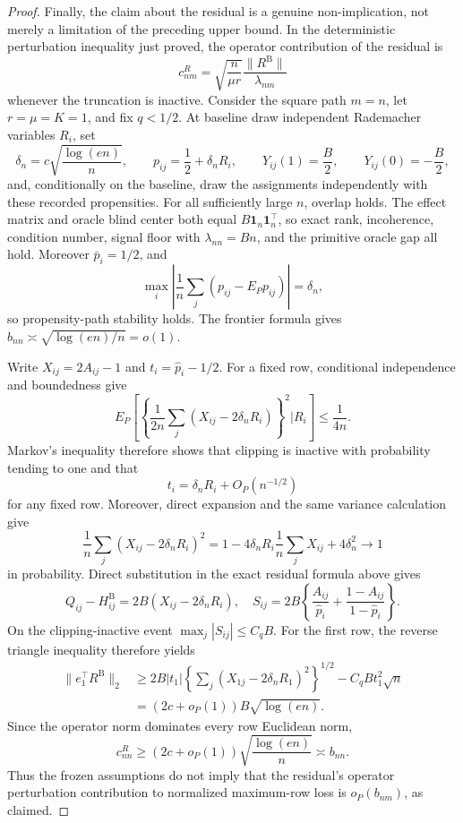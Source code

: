 \documentclass{article}
\begin{document}
\begin{proof}
Finally, the claim about the residual is a genuine non-implication, not merely a limitation of the preceding upper bound.  In the deterministic perturbation inequality just proved, the operator contribution of the residual is
\[
 c^{R}_{nm}=\sqrt{\frac n{\mu r}}\frac{\lVert R^{\mathrm B}\rVert}{\lambda_{nm}}
\]
whenever the truncation is inactive.  Consider the square path \(m=n\), let \(r=\mu=K=1\), and fix \(q<1/2\).  At baseline draw independent Rademacher variables \(R_i\), set
\[
 \delta_n=c\sqrt{\frac{\log(en)}n},\qquad
 p_{ij}=\frac12+\delta_nR_i,\qquad
 Y_{ij}(1)=\frac B2,\qquad Y_{ij}(0)=-\frac B2,
\]
and, conditionally on the baseline, draw the assignments independently with these recorded propensities.  For all sufficiently large \(n\), overlap holds.  The effect matrix and oracle blind center both equal \(B\mathbf1_n\mathbf1_n^\top\), so exact rank, incoherence, condition number, signal floor with \(\lambda_{nn}=Bn\), and the primitive oracle gap all hold.  Moreover \(\bar p_i=1/2\), and
\[
 \max_i\left|\frac1n\sum_j(p_{ij}-E_Pp_{ij})\right|=\delta_n,
\]
so propensity-path stability holds.  The frontier formula gives \(b_{nn}\asymp\sqrt{\log(en)/n}=o(1)\).

Write \(X_{ij}=2A_{ij}-1\) and \(t_i=\widehat p_i-1/2\).  For a fixed row, conditional independence and boundedness give
\[
 E_P\!\left[\left\{\frac1{2n}\sum_j(X_{ij}-2\delta_nR_i)\right\}^2
 \mathrel{\Big|}R_i\right]\le\frac1{4n}.
\]
Markov's inequality therefore shows that clipping is inactive with probability tending to one and that
\[
 t_i=\delta_nR_i+O_P(n^{-1/2})
\]
for any fixed row.  Moreover, direct expansion and the same variance calculation give
\[
 \frac1n\sum_j(X_{ij}-2\delta_nR_i)^2
 =1-4\delta_nR_i\frac1n\sum_jX_{ij}+4\delta_n^2
 \longrightarrow1
\]
in probability.  Direct substitution in the exact residual formula above gives
\[
 Q_{ij}-H^{\mathrm B}_{ij}=2B(X_{ij}-2\delta_nR_i),
 \quad
 S_{ij}=2B\left\{\frac{A_{ij}}{\widehat p_i}
 +\frac{1-A_{ij}}{1-\widehat p_i}\right\}.
\]
On the clipping-inactive event \(\max_j|S_{ij}|\le C_qB\).  For the first row, the reverse triangle inequality therefore yields
\[
 \begin{aligned}
 \lVert e_1^\top R^{\mathrm B}\rVert_2
 &\ge 2B|t_1|
 \left\{\sum_j(X_{1j}-2\delta_nR_1)^2\right\}^{1/2}
 -C_qBt_1^2\sqrt n\\
 &=(2c+o_P(1))B\sqrt{\log(en)}.
 \end{aligned}
\]
Since the operator norm dominates every row Euclidean norm,
\[
 c^R_{nn}\ge(2c+o_P(1))\sqrt{\frac{\log(en)}n}\asymp b_{nn}.
\]
Thus the frozen assumptions do not imply that the residual's operator perturbation contribution to normalized maximum-row loss is \(o_P(b_{nm})\), as claimed.
\end{proof}
\end{document}
